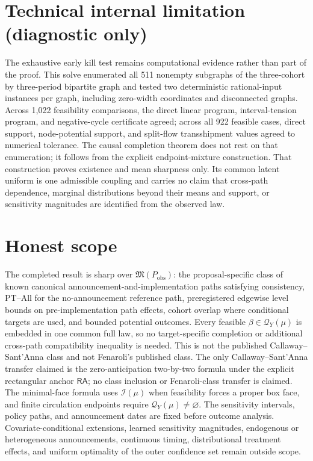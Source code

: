 \documentclass{article}
\begin{document}
\section*{Technical internal limitation (diagnostic only)}

The exhaustive early kill test remains computational evidence rather than part of the proof. This solve enumerated all 511 nonempty subgraphs of the three-cohort by three-period bipartite graph and tested two deterministic rational-input instances per graph, including zero-width coordinates and disconnected graphs. Across 1,022 feasibility comparisons, the direct linear program, interval-tension program, and negative-cycle certificate agreed; across all 922 feasible cases, direct support, node-potential support, and split-flow transshipment values agreed to numerical tolerance. The causal completion theorem does not rest on that enumeration; it follows from the explicit endpoint-mixture construction. That construction proves existence and mean sharpness only. Its common latent uniform is one admissible coupling and carries no claim that cross-path dependence, marginal distributions beyond their means and support, or sensitivity magnitudes are identified from the observed law.

\section{Honest scope}

The completed result is sharp over \(\mathfrak M(P_{\mathrm{obs}})\): the proposal-specific class of known canonical announcement-and-implementation paths satisfying consistency, PT--All for the no-announcement reference path, preregistered edgewise level bounds on pre-implementation path effects, cohort overlap where conditional targets are used, and bounded potential outcomes. Every feasible \(\beta\in\mathcal Q_Y(\mu)\) is embedded in one common full law, so no target-specific completion or additional cross-path compatibility inequality is needed. This is not the published Callaway--Sant'Anna class and not Fenaroli's published class. The only Callaway--Sant'Anna transfer claimed is the zero-anticipation two-by-two formula under the explicit rectangular anchor \(\mathsf{RA}\); no class inclusion or Fenaroli-class transfer is claimed. The minimal-face formula uses \(\mathcal I(\mu)\) when feasibility forces a proper box face, and finite circulation endpoints require \(\mathcal Q_Y(\mu)\ne\varnothing\). The sensitivity intervals, policy paths, and announcement dates are fixed before outcome analysis. Covariate-conditional extensions, learned sensitivity magnitudes, endogenous or heterogeneous announcements, continuous timing, distributional treatment effects, and uniform optimality of the outer confidence set remain outside scope.
\end{document}

